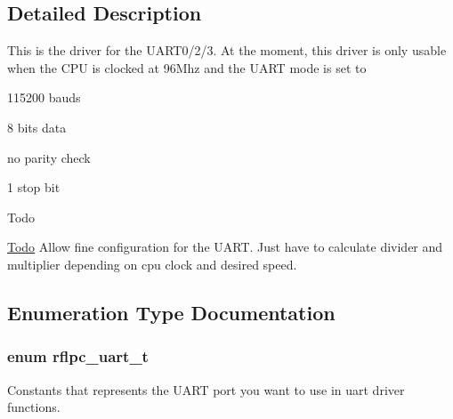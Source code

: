 \subsection{Detailed Description}
This is the driver for the U\-A\-R\-T0/2/3. At the moment, this driver is only usable when the C\-P\-U is clocked at 96\-Mhz and the U\-A\-R\-T mode is set to
\begin{DoxyItemize}
\item 115200 bauds
\item 8 bits data
\item no parity check
\item 1 stop bit \begin{DoxyRefDesc}{Todo}
\item[\hyperlink{todo__todo000003}{Todo}]Allow fine configuration for the U\-A\-R\-T. Just have to calculate divider and multiplier depending on cpu clock and desired speed.\end{DoxyRefDesc}

\end{DoxyItemize}

\subsection{Enumeration Type Documentation}
\hypertarget{group__uart_gab5996edf55ac7654ec4040e6aedaa7ca}{
\subsubsection[{rflpc\-\_\-uart\-\_\-t}]{\setlength{\rightskip}{0pt plus 5cm}enum {\bf rflpc\-\_\-uart\-\_\-t}}}\label{group__uart_gab5996edf55ac7654ec4040e6aedaa7ca}


Constants that represents the U\-A\-R\-T port you want to use in uart driver functions. 


